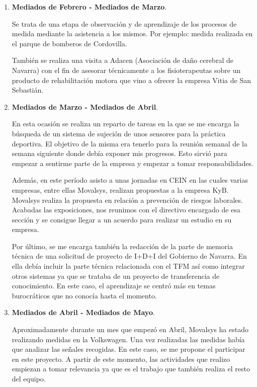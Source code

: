 				\begin{enumerate}
					\item \textbf{Mediados de Febrero - Mediados de Marzo}.
					
					 Se trata de una etapa de observación y de aprendizaje de los procesos de medida mediante la asistencia a los mismos. Por ejemplo: medida realizada en el parque de bomberos de Cordovilla.
					
					También se realiza una visita a Adacen (Asociación de daño cerebral de Navarra) con el fin de asesorar técnicamente a los fisioterapeutas sobre un producto de rehabilitación motora que vino a ofrecer la empresa Vitia de San Sebastián. 
					
					\item \textbf{Mediados de Marzo - Mediados de Abril}.
					
					En esta ocasión se realiza un reparto de tareas en la que se me encarga la búsqueda de un sistema de sujeción de unos sensores para la práctica deportiva. El objetivo de la misma era tenerlo para la reunión semanal de la semana siguiente donde debía exponer mis progresos. Esto sirvió para empezar a sentirme parte de la empresa y empezar a tomar responsabilidades.
					
					Además, en este período asisto a unas jornadas en CEIN en las cuales varias empresas, entre ellas Movalsys, realizan propuestas a la empresa KyB. Movalsys realiza la propuesta en relación a prevención de riesgos laborales. Acabadas las exposiciones, nos reunimos con el directivo encargado de esa sección y se consigue llegar a un acuerdo para realizar un estudio en su empresa.
					
					Por último, se me encarga también la redacción de la parte de memoria técnica de una solicitud de proyecto de I+D+I del Gobierno de Navarra. En ella debía incluir la parte técnica relacionada con el TFM así como integrar otros sistemas ya que se trataba de un proyecto de transferencia de conocimiento. En este caso, el aprendizaje se centró más en temas burocráticos que no conocía hasta el momento.
						
					\item \textbf{Mediados de Abril - Mediados de Mayo}.
					
					Aproximadamente durante un mes que empezó en Abril, Movalsys ha estado realizando medidas en la Volkswagen. Una vez realizadas las medidas había que analizar las señales recogidas. En este caso, se me propone el  participar en este proyecto. A partir de este momento, las actividades que realizo empiezan a tomar relevancia ya que es el  trabajo que también realiza el resto del equipo.
					

\end{enumerate}
